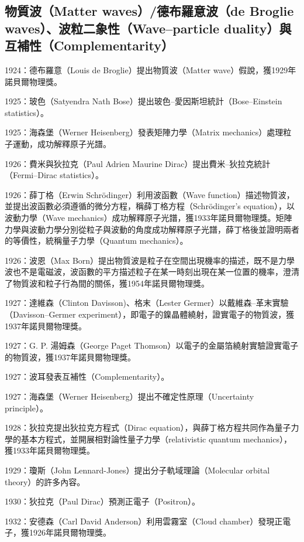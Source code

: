 \documentclass[a4paper,12pt]{article}
\begin{document}
\subsection{物質波（Matter waves）/德布羅意波（de Broglie waves）、波粒二象性（Wave–particle duality）與互補性（Complementarity）}
\bit
\item 1924：德布羅意（Louis de Broglie）提出物質波（Matter wave）假說，獲1929年諾貝爾物理獎。
\item 1925：玻色（Satyendra Nath Bose）提出玻色–愛因斯坦統計（Bose–Einstein statistics）。
\item 1925：海森堡（Werner Heisenberg）發表矩陣力學（Matrix mechanics）處理粒子運動，成功解釋原子光譜。
\item 1926：費米與狄拉克（Paul Adrien Maurine Dirac）提出費米–狄拉克統計（Fermi–Dirac statistics）。
\item 1926：薛丁格（Erwin Schrödinger）利用波函數（Wave function）描述物質波，並提出波函數必須遵循的微分方程，稱薛丁格方程（Schrödinger's equation），以波動力學（Wave mechanics）成功解釋原子光譜，獲1933年諾貝爾物理獎。矩陣力學與波動力學分別從粒子與波動的角度成功解釋原子光譜，薛丁格後並證明兩者的等價性，統稱量子力學（Quantum mechanics）。
\item 1926：波恩（Max Born）提出物質波是粒子在空間出現機率的描述，既不是力學波也不是電磁波，波函數的平方描述粒子在某一時刻出現在某一位置的機率，澄清了物質波和粒子行為間的關係，獲1954年諾貝爾物理獎。
\item 1927：達維森（Clinton Davisson)、格末（Lester Germer）以戴維森–革末實驗（Davisson–Germer experiment），即電子的鎳晶體繞射，證實電子的物質波，獲1937年諾貝爾物理獎。
\item 1927：G. P. 湯姆森（George Paget Thomson）以電子的金屬箔繞射實驗證實電子的物質波，獲1937年諾貝爾物理獎。
\item 1927：波耳發表互補性（Complementarity）。
\item 1927：海森堡（Werner Heisenberg）提出不確定性原理（Uncertainty principle）。
\item 1928：狄拉克提出狄拉克方程式（Dirac equation），與薛丁格方程共同作為量子力學的基本方程式，並開展相對論性量子力學（relativistic quantum mechanics），獲1933年諾貝爾物理獎。
\item 1929：瓊斯（John Lennard-Jones）提出分子軌域理論（Molecular orbital theory）的許多內容。
\item 1930：狄拉克（Paul Dirac）預測正電子（Positron）。
\item 1932：安德森（Carl David Anderson）利用雲霧室（Cloud chamber）發現正電子，獲1926年諾貝爾物理獎。
\end{document}
